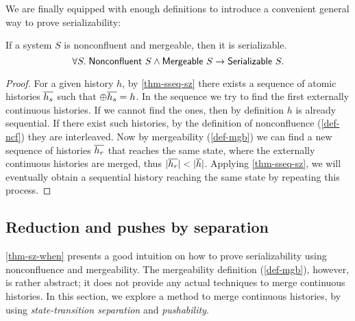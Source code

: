 We are finally equipped with enough definitions to introduce a convenient general way to prove serializability:
\begin{theorem}
  If a system $S$ is nonconfluent and mergeable, then it is serializable.
  \begin{displaymath}
    \forall S.\; \mathsf{Nonconfluent}\ S \land \mathsf{Mergeable}\ S \to \mathsf{Serializable}\ S.
  \end{displaymath}
  \vspace{-15pt}
  \label{thm-sz-when}
\end{theorem}
\begin{proof}
  For a given history $h$, by \autoref{thm-sseq-sz} there exists a sequence of atomic histories $\overline{h_s}$ such that $\oplus \overline{h_s} = h$.
  In the sequence we try to find the first externally continuous histories.
  If we cannot find the ones, then by definition $h$ is already sequential.
  If there exist such histories, by the definition of nonconfluence (\autoref{def-ncf}) they are interleaved.
  Now by mergeability (\autoref{def-mgb}) we can find a new sequence of histories $\overline{h_r}$ that reaches the same state, where the externally continuous histories are merged, thus $| \overline{h_r} | < | \overline{h} |$.
  Applying \autoref{thm-sseq-sz}, we will eventually obtain a sequential history reaching the same state by repeating this process.
\end{proof}

\subsection{Reduction and pushes by separation}

\newcommand{\aobjs}[1]{\ensuremath{\mathsf{objs}\,(#1)}}
\newcommand{\achns}[1]{\ensuremath{\mathsf{chns}\,(#1)}}
\newcommand{\ainputs}[1]{\ensuremath{\mathsf{ins}\,(#1)}}
\newcommand{\aoutputs}[1]{\ensuremath{\mathsf{outs}\,(#1)}}
\newcommand{\ainits}[1]{\ensuremath{\mathsf{inits}\,(#1)}}
\newcommand{\alives}[1]{\ensuremath{\mathsf{lives}\,(#1)}}
\newcommand{\objsep}[2]{\ensuremath{\mathsf{ObjSep}\ #1\ #2}}
\newcommand{\objseph}[2]{\ensuremath{\mathsf{ObjSepHst}\ #1\ #2}}
\newcommand{\msgseph}[2]{\ensuremath{\mathsf{MsgSepHst}\ #1\ #2}}
\newcommand{\stseph}[2]{\ensuremath{\mathsf{SepHst}\ #1\ #2}}

\autoref{thm-sz-when} presents a good intuition on how to prove serializability using nonconfluence and mergeability.
The mergeability definition (\autoref{def-mgb}), however, is rather abstract; it does not provide any actual techniques to merge continuous histories.
In this section, we explore a method to merge continuous histories, by using \emph{state-transition separation} and \emph{pushability}.

